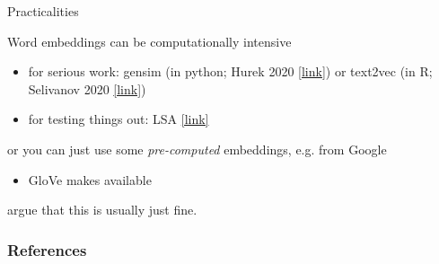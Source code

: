 \documentclass{hertieteaching}
\begin{document}
\begin{frame}{Practicalities}

Word embeddings can be computationally intensive
\begin{itemize}
  \item for serious work: \textsf{gensim} (in python; Hurek 2020 \href{https://radimrehurek.com/gensim/}{[link]}) or \textsf{text2vec} (in R; Selivanov 2020 \href{http://text2vec.org}{[link]}) 
  \item for testing things out: LSA \href{https://quanteda.io/articles/pkgdown/examples/lsa.html}{[link]}
\end{itemize}
or you can just use some \textit{pre-computed} embeddings, e.g. from Google
\begin{itemize}
  \item \textsf{GloVe} makes available
\end{itemize}
\textcite{Rodriguez.Spirling2020} argue that this is usually just fine.
  
\end{frame}



\begin{frame}[allowframebreaks]
\frametitle{References}
\printbibliography	
\end{frame}
\end{document}
